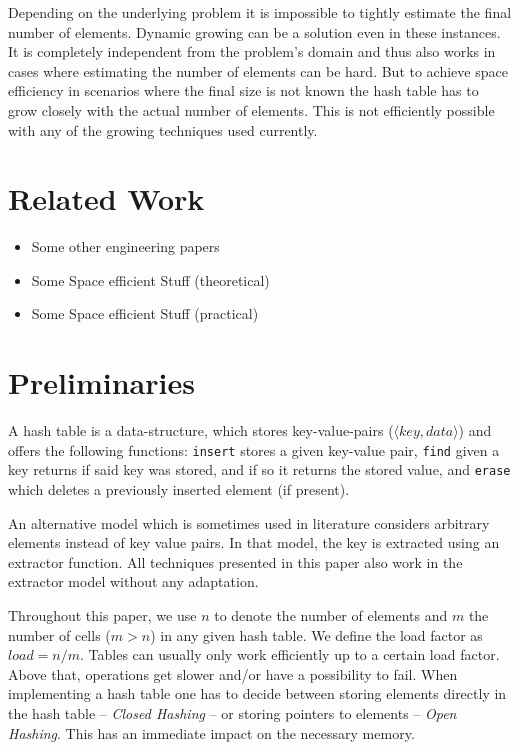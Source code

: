 \documentclass[a4paper,UKenglish]{lipics-v2016}
\begin{document}
Depending on the underlying problem it is impossible to tightly
estimate the final number of elements.  Dynamic growing can be a
solution even in these instances.  It is completely independent from
the problem's domain and thus also works in cases where estimating the
number of elements can be hard.  But to achieve space efficiency in
scenarios where the final size is not known the hash table has to grow
closely with the actual number of elements.  This is not efficiently
possible with any of the growing techniques used currently.

\section{Related Work}
\begin{itemize}
\item Some other engineering papers

\item Some Space efficient Stuff  (theoretical)

\item Some Space efficient Stuff  (practical)
\end{itemize}

\section{Preliminaries}
A hash table is a data-structure, which stores key-value-pairs
($\langle key, data \rangle$) and offers the following functions:
\verb~insert~ stores a given key-value pair, \verb~find~ given a key returns if
said key was stored, and if so it returns the stored value, and
\verb~erase~ which deletes a previously inserted element (if present).

An alternative model which is sometimes used in literature considers
arbitrary elements instead of key value pairs.  In that model, the key
is extracted using an extractor function.  All techniques presented in
this paper also work in the extractor model without any adaptation.

Throughout this paper, we use $n$ to denote the number of elements and
$m$ the number of cells ($m > n$) in any given hash table.  We define
the load factor as $load = n/m$.  Tables can usually only work
efficiently up to a certain load factor.  Above that, operations get
slower and/or have a possibility to fail.
When implementing a hash table one has to decide between storing
elements directly in the hash table -- \emph{Closed Hashing} -- or storing
pointers to elements -- \emph{Open Hashing}. This has an immediate impact
on the necessary memory.
\end{document}
